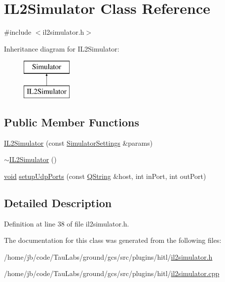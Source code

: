 \hypertarget{class_i_l2_simulator}{\section{\-I\-L2\-Simulator \-Class \-Reference}
\label{class_i_l2_simulator}
}


{\ttfamily \#include $<$il2simulator.\-h$>$}

\-Inheritance diagram for \-I\-L2\-Simulator\-:\begin{figure}[H]
\begin{center}
\leavevmode
\includegraphics[height=2.000000cm]{class_i_l2_simulator}
\end{center}
\end{figure}
\subsection*{\-Public \-Member \-Functions}
\begin{DoxyCompactItemize}
\item 
\hyperlink{group___h_i_t_l_plugin_gae9b990b18a524ff0201db3bbd5608950}{\-I\-L2\-Simulator} (const \hyperlink{group___h_i_t_l_plugin_ga052199f1328d3002bce3e45345aa7f4e}{\-Simulator\-Settings} \&params)
\item 
\hyperlink{group___h_i_t_l_plugin_gaa5f298fa31201781813a733316fc02e4}{$\sim$\-I\-L2\-Simulator} ()
\item 
\hyperlink{group___u_a_v_objects_plugin_ga444cf2ff3f0ecbe028adce838d373f5c}{void} \hyperlink{group___h_i_t_l_plugin_ga26c1964cdb6c16877509250d1ba197c7}{setup\-Udp\-Ports} (const \hyperlink{group___u_a_v_objects_plugin_gab9d252f49c333c94a72f97ce3105a32d}{\-Q\-String} \&host, int in\-Port, int out\-Port)
\end{DoxyCompactItemize}


\subsection{\-Detailed \-Description}


\-Definition at line 38 of file il2simulator.\-h.



\-The documentation for this class was generated from the following files\-:\begin{DoxyCompactItemize}
\item 
/home/jb/code/\-Tau\-Labs/ground/gcs/src/plugins/hitl/\hyperlink{il2simulator_8h}{il2simulator.\-h}\item 
/home/jb/code/\-Tau\-Labs/ground/gcs/src/plugins/hitl/\hyperlink{il2simulator_8cpp}{il2simulator.\-cpp}\end{DoxyCompactItemize}

